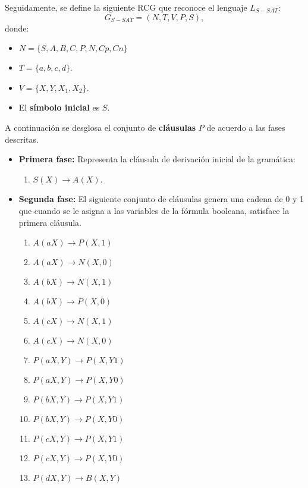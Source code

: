 \documentclass{article}
\begin{document}
Seguidamente, se define la siguiente RCG que reconoce el lenguaje $L_{S-SAT}$:
\[
    G_{S-SAT} = (N, T, V, P, S),
\]
donde:

\begin{itemize}
    \item $N=\{S,A,B,C,P,N,Cp,Cn\}$
    \item $T=\{a,b,c,d\}$.
    \item $V=\{X,Y,X_1,X_2\}$.
    \item El \textbf{símbolo inicial} es $S$.
\end{itemize}

A continuación se desglosa el conjunto de \textbf{cláusulas} $P$ de acuerdo a las fases descritas.

\begin{itemize}
    \item \textbf{Primera fase:} Representa la cláusula de derivación inicial de la gramática:
          \begin{enumerate}
              \item $S(X)\to A(X)$.
          \end{enumerate}

    \item \textbf{Segunda fase:} El siguiente conjunto de cláusulas genera una cadena de 0 y 1 que cuando se le asigna a las variables de la fórmula booleana, satisface la primera cláusula.
          \begin{multicols}{2}
              \begin{enumerate}[start=2]
                  \item $A(aX)\to P(X,1)$
                  \item $A(aX)\to N(X,0)$
                  \item $A(bX)\to N(X,1)$
                  \item $A(bX)\to P(X,0)$
                  \item $A(cX)\to N(X,1)$
                  \item $A(cX)\to N(X,0)$

                  \item $P(aX,Y)\to P(X,Y1)$
                  \item $P(aX,Y)\to P(X,Y0)$
                  \item $P(bX,Y)\to P(X,Y1)$
                  \item $P(bX,Y)\to P(X,Y0)$
                  \item $P(cX,Y)\to P(X,Y1)$
                  \item $P(cX,Y)\to P(X,Y0)$
                  \item $P(dX,Y)\to B(X,Y)$


\end{enumerate}
\end{multicols}
\end{itemize}
\end{document}
